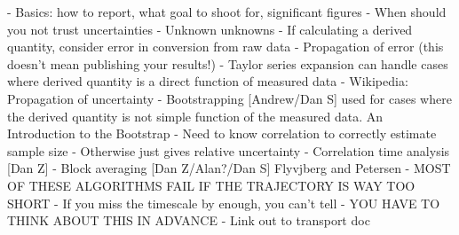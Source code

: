 - Basics: how to report, what goal to shoot for, significant figures
- When should you not trust uncertainties
    - Unknown unknowns
- If calculating a derived quantity, consider error in conversion from raw data 
    - Propagation of error (this doesn’t mean publishing your results!)
    - Taylor series expansion can handle cases where derived quantity is a direct function of measured data
    - Wikipedia: Propagation of uncertainty
    - Bootstrapping [Andrew/Dan S]
used for cases where the derived quantity is not simple function of the measured data.
An Introduction to the Bootstrap
    - Need to know correlation to correctly estimate sample size
    - Otherwise just gives relative uncertainty
- Correlation time analysis [Dan Z]
- Block averaging [Dan Z/Alan?/Dan S] Flyvjberg and Petersen 
- MOST OF THESE ALGORITHMS FAIL IF THE TRAJECTORY IS WAY TOO SHORT
    - If you miss the timescale by enough, you can’t tell
    - YOU HAVE TO THINK ABOUT THIS IN ADVANCE
- Link out to transport doc
